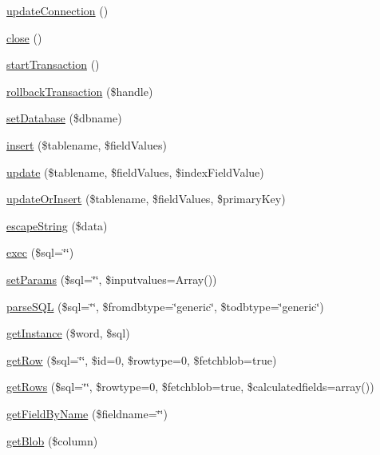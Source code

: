 \begin{DoxyCompactItemize}
\item 
\hyperlink{classDebby_af1c5109d660051d5d1d2f8e88d776cea}{update\+Connection} ()
\item 
\hyperlink{classDebby_a06df5effa73c9b99f02d0fdeebecbf0f}{close} ()
\item 
\hyperlink{classDebby_ad97845c3825dd2a5c44a8dcfc6bfda65}{start\+Transaction} ()
\item 
\hyperlink{classDebby_acbf53661ff480214270460ed6c3c915f}{rollback\+Transaction} (\$handle)
\item 
\hyperlink{classDebby_a462573b994e1cd2bdbe58c43232187d3}{set\+Database} (\$dbname)
\item 
\hyperlink{classDebby_aafffcf8afae3d308853f4452cd09babe}{insert} (\$tablename, \$field\+Values)
\item 
\hyperlink{classDebby_a482145f057ea4b31d4414d0ea8997244}{update} (\$tablename, \$field\+Values, \$index\+Field\+Value)
\item 
\hyperlink{classDebby_a1c8694a0b2bec1152c6d42e61ff3b246}{update\+Or\+Insert} (\$tablename, \$field\+Values, \$primary\+Key)
\item 
\hyperlink{classDebby_a6bb2e5dfb70e57d980b9141ac44d0899}{escape\+String} (\$data)
\item 
\hyperlink{classDebby_a246a7d5268c855f26ce31f4088ce56e9}{exec} (\$sql=\char`\"{}\char`\"{})
\item 
\hyperlink{classDebby_a3e22f5b7c5524ca41f92ed4cb4bb50ed}{set\+Params} (\$sql=\char`\"{}\char`\"{}, \$inputvalues=Array())
\item 
\hyperlink{classDebby_a158d8946c888e34ad361f91645c21084}{parse\+S\+Q\+L} (\$sql=\char`\"{}\char`\"{}, \$fromdbtype=\char`\"{}generic\char`\"{}, \$todbtype=\char`\"{}generic\char`\"{})
\item 
\hyperlink{classDebby_a84bc3c4e3d17a383ed9d52601307be51}{get\+Instance} (\$word, \$sql)
\item 
\hyperlink{classDebby_ad22b79682ec8b3d4802ed60968249fd6}{get\+Row} (\$sql=\char`\"{}\char`\"{}, \$id=0, \$rowtype=0, \$fetchblob=true)
\item 
\hyperlink{classDebby_a0f983cda85b634ae248dd528a605ce56}{get\+Rows} (\$sql=\char`\"{}\char`\"{}, \$rowtype=0, \$fetchblob=true, \$calculatedfields=array())
\item 
\hyperlink{classDebby_ae3da5f2c30b39f32c11450f95a684613}{get\+Field\+By\+Name} (\$fieldname=\char`\"{}\char`\"{})
\item 
\hyperlink{classDebby_a0c6292e7aae1a2161145246065dd206f}{get\+Blob} (\$column)
\item 

\end{DoxyCompactItemize}
